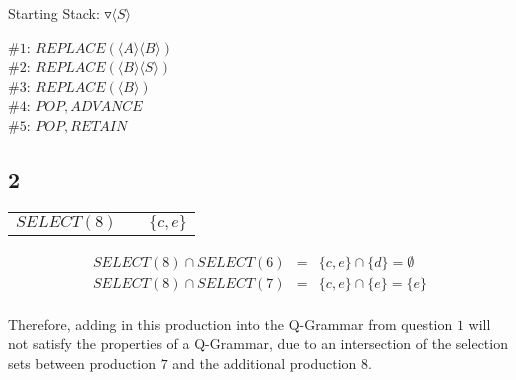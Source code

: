 \documentclass[a4paper,12pt]{article}
\newcommand{\nonterminal}[1]{\langle #1 \rangle}
\begin{document}
Starting Stack: $\triangledown \nonterminal{S}$

$\#1$: $REPLACE(\nonterminal{A}\nonterminal{B})$ \\
$\#2$: $REPLACE(\nonterminal{B}\nonterminal{S})$ \\
$\#3$: $REPLACE(\nonterminal{B})$ \\
$\#4$: $POP,ADVANCE$ \\
$\#5$: $POP,RETAIN$ \\

\subsection*{2}

\begin{tabular}{lcl}
$SELECT(8)$	&	\hspace{10mm}	&	$\{c,e\}$	\\
\end{tabular}

\begin{eqnarray*}
SELECT(8) \cap SELECT(6)	&	=	&	\{c,e\} \cap \{d\} = \emptyset \\
SELECT(8) \cap SELECT(7)	&	=	&	\{c,e\} \cap \{e\} = \{e\} \\
\end{eqnarray*}

Therefore, adding in this production into the Q-Grammar from question $1$
will not satisfy the properties of a Q-Grammar, due to an intersection
of the selection sets between production $7$ and the additional
production $8$.
\end{document}
